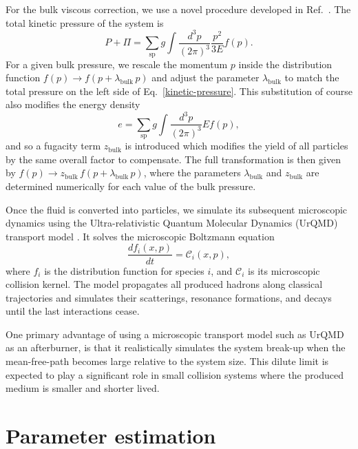 \documentclass[aps,prc,reprint,amsmath,nofootinbib]{revtex4-1}
\begin{document}
For the bulk viscous correction, we use a novel procedure developed in Ref.~\cite{Bernhard:2018hnz}.
The total kinetic pressure of the system is
\begin{equation}
  \label{kinetic-pressure}
  P + \Pi = \sum\limits_\mathrm{sp} g \int \frac{d^3p}{(2\pi)^3} \frac{p^2}{3E} f(p).
\end{equation}
For a given bulk pressure, we rescale the momentum $p$ inside the distribution function $f(p) \rightarrow f(p + \lambda_\mathrm{bulk}\, p)$ and adjust the parameter $\lambda_\mathrm{bulk}$ to match the total pressure on the left side of Eq.~\eqref{kinetic-pressure}.
This substitution of course also modifies the energy density
\begin{equation}
  e = \sum\limits_\mathrm{sp} g \int \frac{d^3p}{(2 \pi)^3} E f(p),
\end{equation}
and so a fugacity term $z_\mathrm{bulk}$ is introduced which modifies the yield of all particles by the same overall factor to compensate.
The full transformation is then given by $f(p) \rightarrow z_\mathrm{bulk}\, f(p + \lambda_\mathrm{bulk}\, p)$, where the parameters $\lambda_\mathrm{bulk}$ and $z_\mathrm{bulk}$ are determined numerically for each value of the bulk pressure.

Once the fluid is converted into particles, we simulate its subsequent microscopic dynamics using the Ultra-relativistic Quantum Molecular Dynamics (UrQMD) transport model \cite{Bass:1998ca, Bleicher:1999xi}.
It solves the microscopic Boltzmann equation
\begin{equation}
  \frac{df_i(x, p)}{dt} = \mathcal{C}_i(x, p),
\end{equation}
where $f_i$ is the distribution function for species $i$, and $\mathcal{C}_i$ is its microscopic collision kernel.
The model propagates all produced hadrons along classical trajectories and simulates their scatterings, resonance formations, and decays until the last interactions cease.

One primary advantage of using a microscopic transport model such as UrQMD as an afterburner, is that it realistically simulates the system break-up when the mean-free-path becomes large relative to the system size.
This dilute limit is expected to play a significant role in small collision systems where the produced medium is smaller and shorter lived.


\section{Parameter estimation}
\label{sec:calibration}
\end{document}

